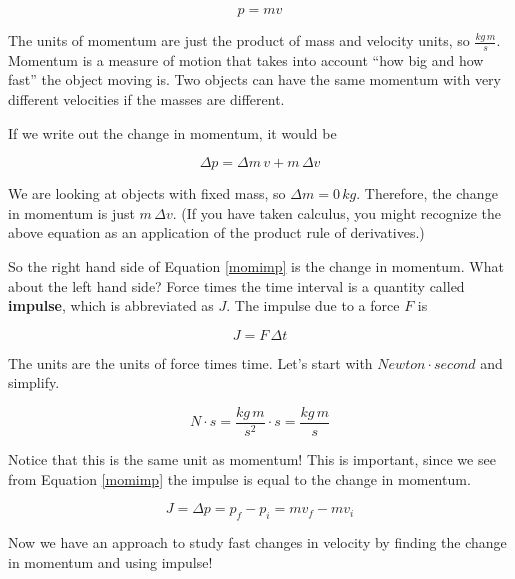 \documentclass[12pt]{book}
\begin{document}
\begin{equation}
p = mv
\label{momdef}
\end{equation}

The units of momentum are just the product of mass and velocity units, so $\frac{kg \, m}{s}$. Momentum is a measure of motion that takes into account ``how big and how fast'' the object moving is. Two objects can have the same momentum with very different velocities if the masses are different.

If we write out the change in momentum, it would be

\begin{equation}
\Delta p = \Delta m \, v + m \, \Delta v
\end{equation}

We are looking at objects with fixed mass, so $\Delta m = 0 \, kg$. Therefore, the change in momentum is just $m \, \Delta v$. (If you have taken calculus, you might recognize the above equation as an application of the product rule of derivatives.)

So the right hand side of Equation \ref{momimp} is the change in momentum. What about the left hand side? Force times the time interval is a quantity called \textbf{impulse}, which is abbreviated as $J$. The impulse due to a force $F$ is

\begin{equation}
J = F \, \Delta t
\label{impdef}
\end{equation}

The units are the units of force times time. Let's start with $Newton \cdot second$ and simplify.

\begin{equation}
N \cdot s = \frac{kg \, m}{s^2} \cdot s = \frac{kg \, m}{s}
\end{equation}

Notice that this is the same unit as momentum! This is important, since we see from Equation \ref{momimp} the impulse is equal to the change in momentum.

\begin{equation}
J = \Delta p = p_f - p_i = m v_f - m v_i
\label{impulse}
\end{equation}

Now we have an approach to study fast changes in velocity by finding the change in momentum and using impulse!
\end{document}
